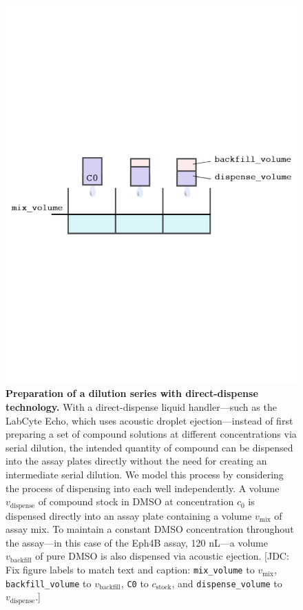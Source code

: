 \documentclass[aps,pre,twocolumn,nofootinbib,superscriptaddress,linenumbers]{revtex4-1}
\begin{document}
\begin{figure}[tb]
    \includegraphics[trim={0 9cm 0 9cm},clip,width=\columnwidth]{../figures/direct_dispense.pdf}

  \caption{{\bf Preparation of a dilution series with direct-dispense technology.}
  With a direct-dispense liquid handler---such as the LabCyte Echo, which uses acoustic droplet ejection---instead of first preparing a set of compound solutions at different concentrations via serial dilution, the intended quantity of compound can be dispensed into the assay plates directly without the need for creating an intermediate serial dilution.
  We model this process by considering the process of dispensing into each well independently.
  A volume $v_\mathrm{dispense}$ of compound stock in DMSO at concentration $c_0$ is dispensed directly into an assay plate containing a volume $v_\mathrm{mix}$ of assay mix.
  To maintain a constant DMSO concentration throughout the assay---in this case of the Eph4B assay, 120 nL---a volume $v_\mathrm{backfill}$ of pure DMSO is also dispensed via acoustic ejection.
  {\color{red}[JDC: Fix figure labels to match text and caption: {\tt mix\_volume} to $v_\mathrm{mix}$, {\tt backfill\_volume} to $v_\mathrm{backfill}$, {\tt C0} to $c_\mathrm{stock}$, and {\tt dispense\_volume} to $v_\mathrm{dispense}$.]}
  }
  \label{fig:direct_dispense}
\end{figure}
\end{document}
